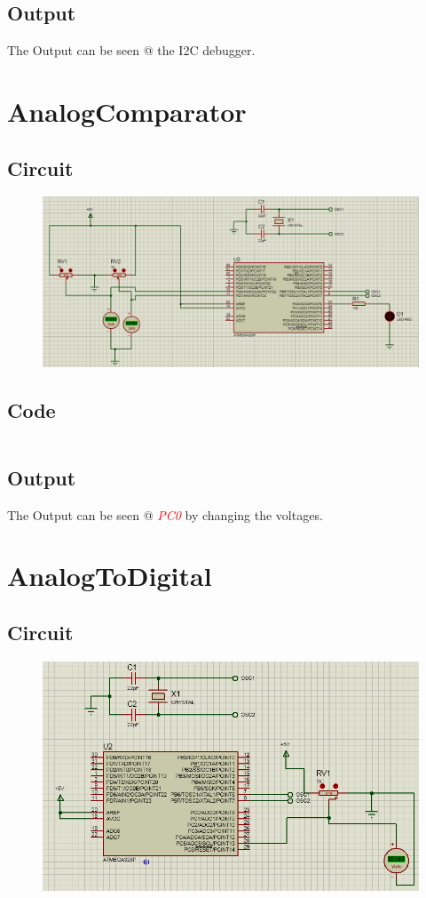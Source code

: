 \documentclass[oneside]{book}
\newcommand{\pinFormat}[1]{\emph{\textcolor{red}{#1}}}
\begin{document}
\subsection{Output}
\quad The Output can be seen @ the I2C debugger.


\section{AnalogComparator}
\subsection{Circuit}
\begin{figure}[H]
    \centering
    \includegraphics[height=0.2\textheight]{AnalogComparator.png}
\end{figure}
\subsection{Code}
\inputminted[bgcolor=black]{c}{./programFiles/AnalogComparator.c}

\subsection{Output}
\quad The Output can be seen @ \pinFormat{PC0} by changing the voltages.

\section{AnalogToDigital}
\subsection{Circuit}
\begin{figure}[H]
    \centering
    \includegraphics[height=0.2\textheight]{AnalogToDigital.png}
\end{figure}
\end{document}
